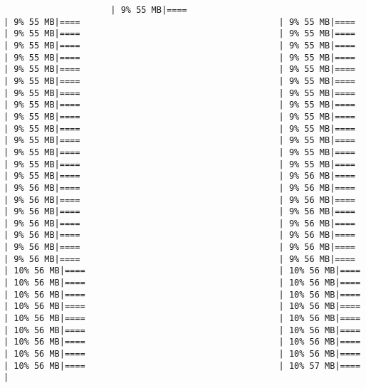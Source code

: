 \documentclass[
]{article}
\begin{document}
\begin{verbatim}
                     | 9% 55 MB|====                                       | 9% 55 MB|====                                       | 9% 55 MB|====                                       | 9% 55 MB|====                                       | 9% 55 MB|====                                       | 9% 55 MB|====                                       | 9% 55 MB|====                                       | 9% 55 MB|====                                       | 9% 55 MB|====                                       | 9% 55 MB|====                                       | 9% 55 MB|====                                       | 9% 55 MB|====                                       | 9% 55 MB|====                                       | 9% 55 MB|====                                       | 9% 55 MB|====                                       | 9% 55 MB|====                                       | 9% 55 MB|====                                       | 9% 55 MB|====                                       | 9% 55 MB|====                                       | 9% 55 MB|====                                       | 9% 55 MB|====                                       | 9% 55 MB|====                                       | 9% 55 MB|====                                       | 9% 55 MB|====                                       | 9% 55 MB|====                                       | 9% 55 MB|====                                       | 9% 55 MB|====                                       | 9% 55 MB|====                                       | 9% 56 MB|====                                       | 9% 56 MB|====                                       | 9% 56 MB|====                                       | 9% 56 MB|====                                       | 9% 56 MB|====                                       | 9% 56 MB|====                                       | 9% 56 MB|====                                       | 9% 56 MB|====                                       | 9% 56 MB|====                                       | 9% 56 MB|====                                       | 9% 56 MB|====                                       | 9% 56 MB|====                                       | 9% 56 MB|====                                       | 9% 56 MB|====                                       | 9% 56 MB|====                                      | 10% 56 MB|====                                      | 10% 56 MB|====                                      | 10% 56 MB|====                                      | 10% 56 MB|====                                      | 10% 56 MB|====                                      | 10% 56 MB|====                                      | 10% 56 MB|====                                      | 10% 56 MB|====                                      | 10% 56 MB|====                                      | 10% 56 MB|====                                      | 10% 56 MB|====                                      | 10% 56 MB|====                                      | 10% 56 MB|====                                      | 10% 56 MB|====                                      | 10% 56 MB|====                                      | 10% 56 MB|====                                      | 10% 56 MB|====                                      | 10% 57 MB|====                                      | 
\end{verbatim}
\end{document}
